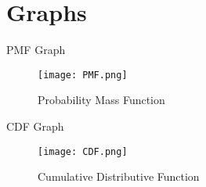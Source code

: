 \documentclass{beamer}
\begin{document}
\section{Graphs}
\begin{frame}{PMF Graph}
    \begin{figure}[!ht]
		\centering
		\texttt{[image: PMF.png]}
		\caption{Probability Mass Function}
		\label{fig1}
	\end{figure}
\end{frame}

\begin{frame}{CDF Graph}
    \begin{figure}[!ht]
		\centering
		\texttt{[image: CDF.png]}
		\caption{Cumulative Distributive Function}
		\label{fig1}
	\end{figure}
\end{frame}
\end{document}

